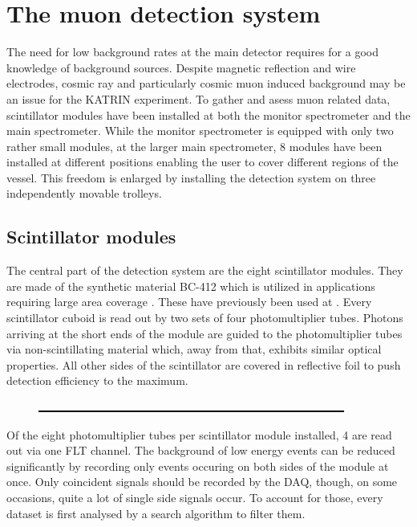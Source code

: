 
\chapter{The muon detection system}
\label{ch:The muon detection system}
  The need for low background rates at the main detector requires for a good knowledge of background sources. Despite magnetic reflection and wire electrodes, cosmic ray and particularly cosmic muon induced background may be an issue for the KATRIN experiment. To gather and asess muon related data, scintillator modules have been installed at both the monitor spectrometer and the main spectrometer. While the monitor spectrometer is equipped with only two rather small modules, at the larger main spectrometer, 8 modules have been installed at different positions enabling the user to cover different regions of the vessel. This freedom is enlarged by installing the detection system on three independently movable trolleys.
  \section{Scintillator modules}
  \label{ch:The muon detection system:sec:Scintillator modules}
  The central part of the detection system are the eight scintillator modules. They are made of the synthetic material BC-412 which is utilized in applications requiring large area coverage \cite{scintillatorManual}. These have previously been used at  . Every scintillator cuboid is read out by two sets of four photomultiplier tubes. Photons arriving at the short ends of the module are guided to the photomultiplier tubes via non-scintillating material which, away from that, exhibits similar optical properties. All other sides of the scintillator are covered in reflective foil to push detection efficiency to the maximum.
  \begin{figure}
    \centering
    \includegraphics[width = 0.9\textwidth]{graphics/dummy.eps}	
  \end{figure}
  Of the eight photomultiplier tubes per scintillator module installed, 4 are read out via one FLT channel. The background of low energy events can be reduced significantly by recording only events occuring on both sides of the module at once. Only coincident signals should be recorded by the DAQ, though, on some occasions, quite a lot of single side signals occur. To account for those, every dataset is first analysed by a search algorithm to filter them.
  

